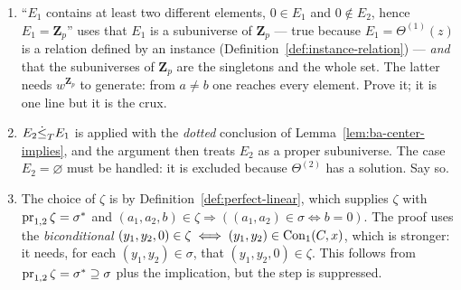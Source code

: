 \begin{hazard}\label{haz:case1c}
\begin{enumerate}\alphlabels\tightlist
\item ``$E_{1}$ contains at least two different elements, $0\in E_{1}$ and
  $0\notin E_{2}$, hence $E_{1}=\mathbf Z_{p}$'' uses that $E_{1}$ is a
  subuniverse of $\mathbf Z_{p}$ --- true because $E_{1}=\Theta^{(1)}(z)$ is a
  relation defined by an instance (Definition~\ref{def:instance-relation}) ---
  \emph{and} that the subuniverses of $\mathbf Z_{p}$ are the singletons and
  the whole set. The latter needs $w^{\mathbf Z_{p}}$ to generate: from $a\ne b$
  one reaches every element. Prove it; it is one line but it is the crux.
\item $E_{2}\dot\le_{T}^{}E_{1}$ is applied with the \emph{dotted} conclusion of
  Lemma~\ref{lem:ba-center-implies}, and the argument then treats $E_{2}$ as a
  proper subuniverse. The case $E_{2}=\varnothing$ must be handled: it is
  excluded because $\Theta^{(2)}$ has a solution. Say so.
\item The choice of $\zeta$ is by Definition~\ref{def:perfect-linear}, which
  supplies $\zeta$ with $\operatorname*{pr}_{1,2}\zeta=\sigma^{*}$ and
  $(a_{1},a_{2},b)\in\zeta\Rightarrow((a_{1},a_{2})\in\sigma\iff b=0)$. The
  proof uses the \emph{biconditional} $(y_{1},y_{2},0)\in\zeta\iff(y_{1},y_{2})
  \in\operatorname{Con}_1(C,x)$, which is stronger: it needs, for each $(y_1,y_2)\in\sigma$,
  that $(y_{1},y_{2},0)\in\zeta$. This follows from $\operatorname*{pr}_{1,2}\zeta
  =\sigma^{*}\supseteq\sigma$ plus the implication, but the step is
  suppressed.
\end{enumerate}
\end{hazard}

